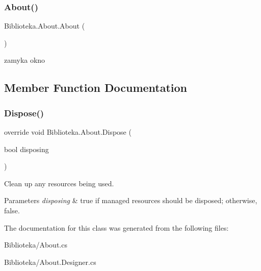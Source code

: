 \subsubsection{\texorpdfstring{About()}{About()}}
{\footnotesize\ttfamily Biblioteka.\+About.\+About (\begin{DoxyParamCaption}{ }\end{DoxyParamCaption})}



zamyka okno 



\subsection{Member Function Documentation}
\mbox{\label{class_biblioteka_1_1_about_ae46b736c38521c1c20e00fad6979cdf9}} 
\subsubsection{\texorpdfstring{Dispose()}{Dispose()}}
{\footnotesize\ttfamily override void Biblioteka.\+About.\+Dispose (\begin{DoxyParamCaption}\item[{bool}]{disposing }\end{DoxyParamCaption})\hspace{0.3cm}{\ttfamily [protected]}}



Clean up any resources being used. 


\begin{DoxyParams}{Parameters}
{\em disposing} & true if managed resources should be disposed; otherwise, false.\\
\hline
\end{DoxyParams}


The documentation for this class was generated from the following files\+:\begin{DoxyCompactItemize}
\item 
Biblioteka/About.\+cs\item 
Biblioteka/About.\+Designer.\+cs\end{DoxyCompactItemize}
